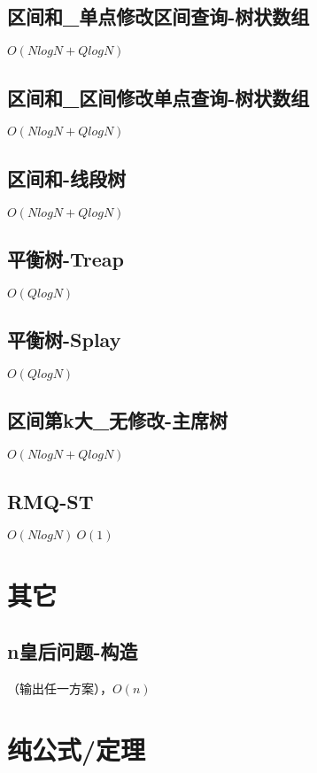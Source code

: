 \documentclass[10pt]{article}
\begin{document}
\subsection{区间和\_单点修改区间查询-树状数组}
$O(NlogN+QlogN)$


\subsection{区间和\_区间修改单点查询-树状数组}
$O(NlogN+QlogN)$


\subsection{区间和-线段树}
$O(NlogN+QlogN)$


\subsection{平衡树-Treap}
$O(QlogN)$


\subsection{平衡树-Splay}
$O(QlogN)$


\subsection{区间第k大\_无修改-主席树}
$O(NlogN+QlogN)$


\subsection{RMQ-ST}
$O(NlogN)~O(1)$

\section{其它}
\subsection{n皇后问题-构造}
（输出任一方案），$O(n)$

\section{纯公式/定理}
\end{document}
